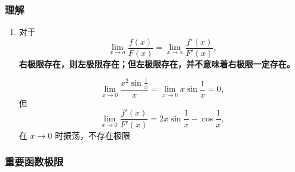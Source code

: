 \documentclass[../book.tex]{subfiles}
\begin{document}
\begin{enumerate}
\begin{minipage}[t]{0.42\linewidth}
        \end{minipage}
    \end{enumerate}

    \subsubsection{理解}

    \begin{enumerate}
        \item 对于
        \[
            \lim_{x\to a} \frac{f(x)}{F(x)}
            =
            \lim_{x\to a} \frac{f'(x)}{F'(x)},
        \]
        \textbf{右极限存在，则左极限存在；但左极限存在，并不意味着右极限一定存在。}
        \begin{analysisbox}
            \[
                \lim_{x \to 0} \frac{x^2 \sin \frac{1}{x}}{x} = \lim_{x \to 0} x \sin \frac{1}{x} = 0,
            \]
            但
            \[
                \lim_{x \to 0} \frac{f'(x)}{F'(x)} = 2x \sin \dfrac{1}{x} - \cos \dfrac{1}{x},
            \]
            在 $x \to 0$ 时振荡，不存在极限
        \end{analysisbox}
    \end{enumerate}

    \subsubsection{重要函数极限}
\end{document}
